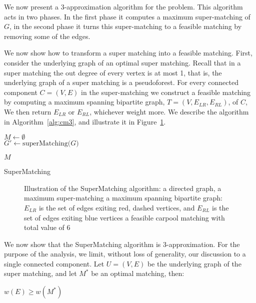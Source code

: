 \label{sub:cm}
We now present a 3-app\-roximation algorithm for the \textsc{\CARPOOL{}} problem.
This algorithm acts in two phases.
In the first phase it computes a maximum super-matching of $G$, 
in the second phase it turns this super-matching to a feasible matching
by removing some of the edges.

We now show how to transform a super matching into a feasible matching.
First, consider the underlying graph of an optimal super matching.
Recall that in a super matching the out degree of every vertex is at most 1,
that is, the underlying graph of a super matching is a pseudoforest.
For every connected component $C = (V, E)$ 
in the super-matching we construct a feasible matching by
computing a maximum spanning bipartite graph, $T = (V, E_{LR}, E_{RL})$, of $C$, 
We then return $E_{LR}$ or $E_{RL}$, whichever weight more. 
We describe the algorithm in Algorithm~\ref{alg:cm3}, 
and illustrate it in Figure~\ref{fig:spanning-bipartite-graph}.   

\begin{algorithm}

$M \leftarrow \emptyset$								\\
$G' \leftarrow \text{superMatching($G$)}$				\\


\Return $M$
\caption{
\label{alg:cm3}
SuperMatching}
\end{algorithm}

\begin{figure}
\centering

\caption[]{
\label{fig:spanning-bipartite-graph}
Illustration of the SuperMatching algorithm:
 a directed graph, 
 a maximum super-matching  
 a maximum spanning bipartite graph:
$E_{LR}$ is the set of edges exiting red, dashed vertices, 
and $E_{RL}$ is the set of edges exiting blue vertices
 a feasible carpool matching with total value of 6   
}
\end{figure}

We now show that the SuperMatching algorithm is 3-approximation.
For the purpose of the analysis, we limit, without loss of generality, 
our discussion to a single connected component.
Let $U = (V, E)$ be the underlying graph of the super matching, 
and let $M^*$ be an optimal matching, then:
\begin{lemma}
\label{lm:super-geq-m^*}
$w(E) \geq w(M^*)$
\end{lemma}

